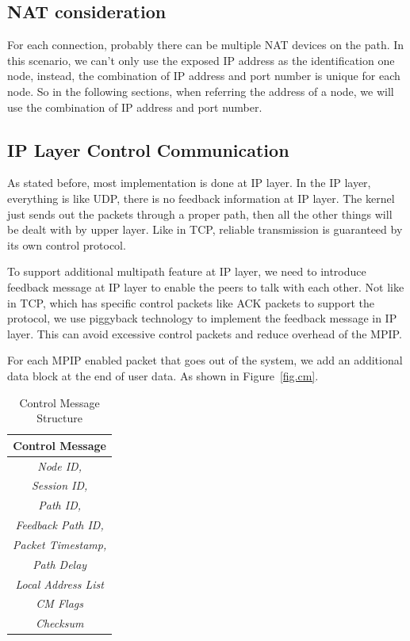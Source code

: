 \subsection{NAT consideration}
For each connection, probably there can be multiple NAT devices on the path. In this scenario, we can't only use the exposed IP address as the identification one node, instead, the combination of IP address and port number is unique for each node. So in the following sections, when referring the address of a node, we will use the combination of IP address and port number.


\subsection{IP Layer Control Communication}
As stated before, most implementation is done at IP layer. In the IP layer, everything is like UDP, there is no feedback information at IP layer. The kernel just sends out the packets through a proper path, then all the other things will be dealt with by upper layer. Like in TCP, reliable transmission is guaranteed by its own control protocol.

To support additional multipath feature at IP layer, we need to introduce feedback message at IP layer to enable the peers to talk with each other. Not like in TCP, which has specific control packets like ACK packets to support the protocol, we use piggyback technology to implement the feedback message in IP layer. This can avoid excessive control packets and reduce overhead of the MPIP.

For each MPIP enabled packet that goes out of the system, we add an additional data block at the end of user data. As shown in Figure~\ref{fig.cm}.


\begin{table}
\caption{\label{tb.cm}Control Message Structure}
\centering
\begin{tabular}{|c|}
\hline
Control Message \\
\hline
\emph{Node ID,} \\
\emph{Session ID,} \\
\emph{Path ID,} \\
\emph{Feedback Path ID,} \\
\emph{Packet Timestamp,} \\
\emph{Path Delay}\\
\emph{Local Address List}\\
\emph{CM Flags}\\
\emph{Checksum}\\
\hline
\end{tabular}
\end{table}


